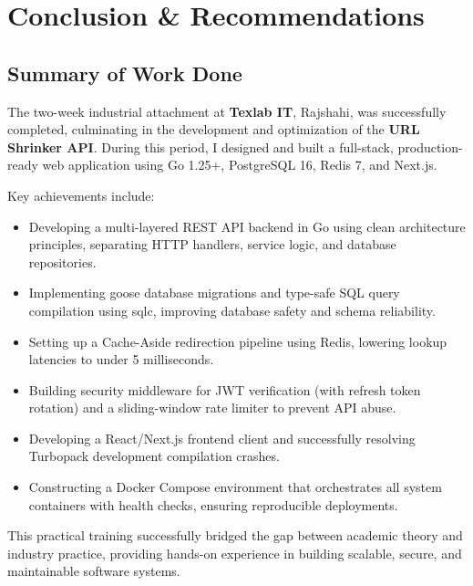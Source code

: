 \chapter{Conclusion \& Recommendations}

\section{Summary of Work Done}
The two-week industrial attachment at \textbf{Texlab IT}, Rajshahi, was successfully completed, culminating in the development and optimization of the \textbf{URL Shrinker API}. During this period, I designed and built a full-stack, production-ready web application using Go 1.25+, PostgreSQL 16, Redis 7, and Next.js. 

Key achievements include:
\begin{itemize}
    \item Developing a multi-layered REST API backend in Go using clean architecture principles, separating HTTP handlers, service logic, and database repositories.
    \item Implementing goose database migrations and type-safe SQL query compilation using sqlc, improving database safety and schema reliability.
    \item Setting up a Cache-Aside redirection pipeline using Redis, lowering lookup latencies to under 5 milliseconds.
    \item Building security middleware for JWT verification (with refresh token rotation) and a sliding-window rate limiter to prevent API abuse.
    \item Developing a React/Next.js frontend client and successfully resolving Turbopack development compilation crashes.
    \item Constructing a Docker Compose environment that orchestrates all system containers with health checks, ensuring reproducible deployments.
\end{itemize}

This practical training successfully bridged the gap between academic theory and industry practice, providing hands-on experience in building scalable, secure, and maintainable software systems.

